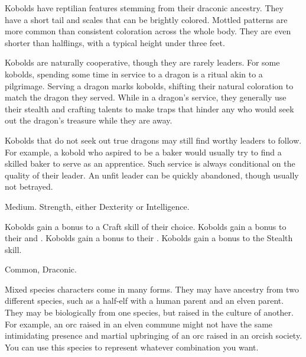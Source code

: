 
  Kobolds have reptilian features stemming from their draconic ancestry.
  They have a short tail and scales that can be brightly colored.
  Mottled patterns are more common than consistent coloration across the whole body.
  They are even shorter than halflings, with a typical height under three feet.

  Kobolds are naturally cooperative, though they are rarely leaders.
  For some kobolds, spending some time in service to a dragon is a ritual akin to a pilgrimage.
  Serving a dragon marks kobolds, shifting their natural coloration to match the dragon they served.
  While in a dragon's service, they generally use their stealth and crafting talents to make traps that hinder any who would seek out the dragon's treasure while they are away.

  Kobolds that do not seek out true dragons may still find worthy leaders to follow.
  For example, a kobold who aspired to be a baker would usually try to find a skilled baker to serve as an apprentice.
  Such service is always conditional on the quality of their leader.
  An unfit leader can be quickly abandoned, though usually not betrayed.

   Medium.
    Strength, either  Dexterity or  Intelligence.
  \begin{raggeditemize}
     Kobolds gain a  bonus to a Craft skill of their choice.
     Kobolds gain a  bonus to their  and .
     Kobolds gain a  bonus to their .
     Kobolds gain a  bonus to the Stealth skill.
  \end{raggeditemize}
   Common, Draconic.


  Mixed species characters come in many forms.
  They may have ancestry from two different species, such as a half-elf with a human parent and an elven parent.
  They may be biologically from one species, but raised in the culture of another.
  For example, an orc raised in an elven commune might not have the same intimidating presence and martial upbringing of an orc raised in an orcish society.
  You can use this species to represent whatever combination you want.

